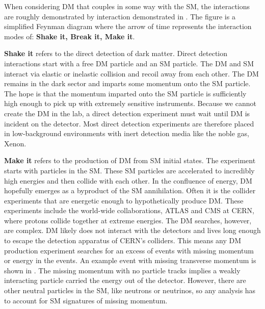 When considering DM that couples in some way with the SM, the interactions are roughly demonstrated by interaction demonstrated in .
The figure is a simplified Feynman diagram where the arrow of time represents the interaction modes of: \textbf{Shake it, Break it, Make it}.

\textbf{Shake it} refers to the direct detection of dark matter.
Direct detection interactions start with a free DM particle and an SM particle.
The DM and SM interact via elastic or inelastic collision and recoil away from each other.
The DM remains in the dark sector and imparts some momentum onto the SM particle.
The hope is that the momentum imparted onto the SM particle is sufficiently high enough to pick up with extremely sensitive instruments.
Because we cannot create the DM in the lab, a direct detection experiment must wait until DM is incident on the detector.
Most direct detection experiments are therefore placed in low-background environments with inert detection media like the noble gas, Xenon. \cite{Cooley:dd_dm}

\textbf{Make it} refers to the production of DM from SM initial states.
The experiment starts with particles in the SM.
These SM particles are accelerated to incredibly high energies and then collide with each other.
In the confluence of energy, DM hopefully emerges as a byproduct of the SM annihilation.
Often it is the collider experiments that are energetic enough to hypothetically produce DM.
These experiments include the world-wide collaborations, ATLAS and CMS at CERN, where protons collide together at extreme energies.
The DM searches, however, are complex.
DM likely does not interact with the detectors and lives long enough to escape the detection apparatus of CERN's colliders.
This means any DM production experiment searches for an excess of events with missing momentum or energy in the events.
An example event with missing transverse momentum is shown in .
The missing momentum with no particle tracks implies a weakly interacting particle carried the energy out of the detector.
However, there are other neutral particles in the SM, like neutrons or neutrinos, so any analysis has to account for SM signatures of missing momentum. \cite{atlas:met_dm_precise}

